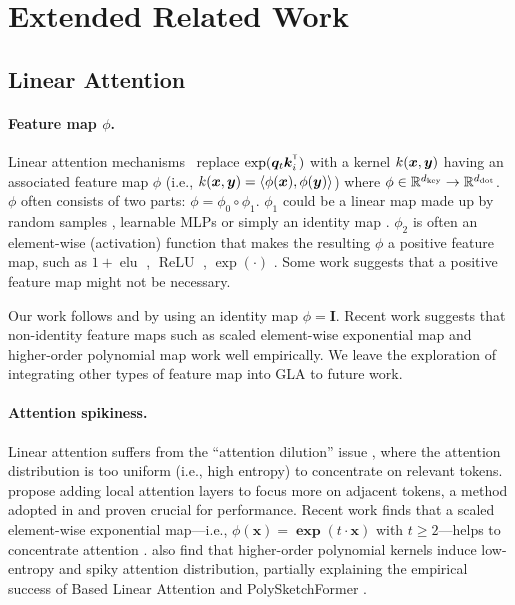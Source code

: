\section{Extended Related Work }
\label{appdx:extended_rw}
\vspace{2mm}




\subsection{Linear Attention}

\paragraph{Feature map $\phi$.} Linear attention mechanisms~\citep{katharopoulos2020transformers} replace $\exp(\vq_t \vk_i^\intercal)$ with a kernel $k({\bm{x}}, {\bm{y}})$ having an associated feature map $\phi$ (i.e., $k({\bm{x}}, {\bm{y}}) = \langle\phi({\bm{x}}), \phi({\bm{y}})\rangle$) where $\phi \in \mathbb{R}^{d_{\text{key}}}\rightarrow \mathbb{R}^{d_{\text{dot}}}$.
$\phi$ often consists of two parts: $\phi = \phi_0 \circ \phi_1$. $\phi_1$ could be a linear map made up by random samples \cite{peng2021random, performer}, learnable MLPs \cite{kasai-etal-2021-finetuning, Hedgehog, polysketch} or simply an identity map \cite{mao-2022-fine}. $\phi_2$ is often an element-wise (activation) function that makes the resulting $\phi$ a positive feature map, such as $1+\operatorname{elu}$ \cite{katharopoulos2020transformers}, $\operatorname{ReLU}$ \cite{kasai-etal-2021-finetuning}, $\exp(\cdot)$ \cite{Hedgehog, performer}. Some work \cite{qin2023scaling, sun2023retentive, mao-2022-fine} suggests that a positive feature map might not be necessary.

Our work follows \citet{sun2023retentive} and \citet{mao-2022-fine} by using an identity map $\phi=\mathbf{I}$.  Recent work suggests that non-identity feature maps such as scaled element-wise exponential map  \cite{log-normal, Hedgehog}
and higher-order polynomial map \cite{Arora2024SimpleLA,polysketch} work well empirically. We leave the exploration of integrating other types of feature map into GLA to future work.


\paragraph{Attention spikiness.} Linear attention suffers from the ``attention dilution'' issue \citep{qin2022devil}, where the attention distribution is too uniform (i.e., high entropy) to concentrate on relevant tokens. \citet{qin2022devil} propose adding local attention layers to focus more on adjacent tokens, a method adopted in \citep{VQ-Transformer, log-normal, orthogonal_memory} and proven crucial for performance. 
Recent work finds that a scaled element-wise exponential map---i.e., $\phi(\mathbf{x})= \mathbf{\exp}(t\cdot \mathbf{x})$ with $t \ge 2$---helps to concentrate attention \cite{log-normal, Hedgehog}. \citet{Hedgehog} also find that higher-order polynomial kernels induce low-entropy and spiky attention distribution, partially explaining the empirical success of Based Linear Attention \cite{Arora2024SimpleLA} and PolySketchFormer \cite{polysketch}.



